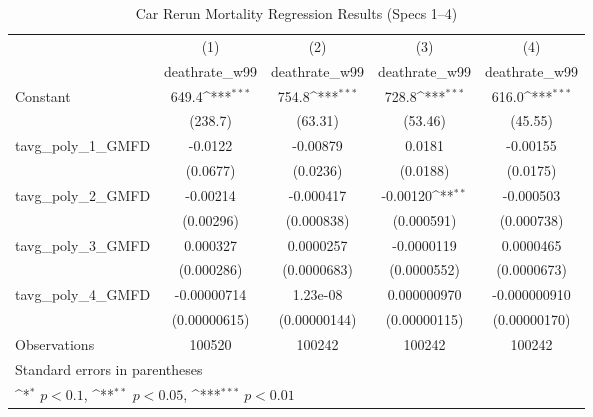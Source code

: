 \begin{table}[htbp]\centering
\def\sym#1{\ifmmode^{#1}\else\(^{#1}\)\fi}
\caption{Car Rerun Mortality Regression Results (Specs 1–4)}
\begin{tabular}{l*{4}{c}}
\hline\hline
                    &\multicolumn{1}{c}{(1)}&\multicolumn{1}{c}{(2)}&\multicolumn{1}{c}{(3)}&\multicolumn{1}{c}{(4)}\\
                    &\multicolumn{1}{c}{deathrate\_w99}&\multicolumn{1}{c}{deathrate\_w99}&\multicolumn{1}{c}{deathrate\_w99}&\multicolumn{1}{c}{deathrate\_w99}\\
\hline
Constant            &       649.4\sym{***}&       754.8\sym{***}&       728.8\sym{***}&       616.0\sym{***}\\
                    &     (238.7)         &     (63.31)         &     (53.46)         &     (45.55)         \\
[1em]
tavg\_poly\_1\_GMFD    &     -0.0122         &    -0.00879         &      0.0181         &    -0.00155         \\
                    &    (0.0677)         &    (0.0236)         &    (0.0188)         &    (0.0175)         \\
[1em]
tavg\_poly\_2\_GMFD    &    -0.00214         &   -0.000417         &    -0.00120\sym{**} &   -0.000503         \\
                    &   (0.00296)         &  (0.000838)         &  (0.000591)         &  (0.000738)         \\
[1em]
tavg\_poly\_3\_GMFD    &    0.000327         &   0.0000257         &  -0.0000119         &   0.0000465         \\
                    &  (0.000286)         & (0.0000683)         & (0.0000552)         & (0.0000673)         \\
[1em]
tavg\_poly\_4\_GMFD    & -0.00000714         &    1.23e-08         & 0.000000970         &-0.000000910         \\
                    &(0.00000615)         &(0.00000144)         &(0.00000115)         &(0.00000170)         \\
\hline
Observations        &      100520         &      100242         &      100242         &      100242         \\
\hline\hline
\multicolumn{5}{l}{\footnotesize Standard errors in parentheses}\\
\multicolumn{5}{l}{\footnotesize \sym{*} \(p<0.1\), \sym{**} \(p<0.05\), \sym{***} \(p<0.01\)}\\
\end{tabular}
\end{table}
